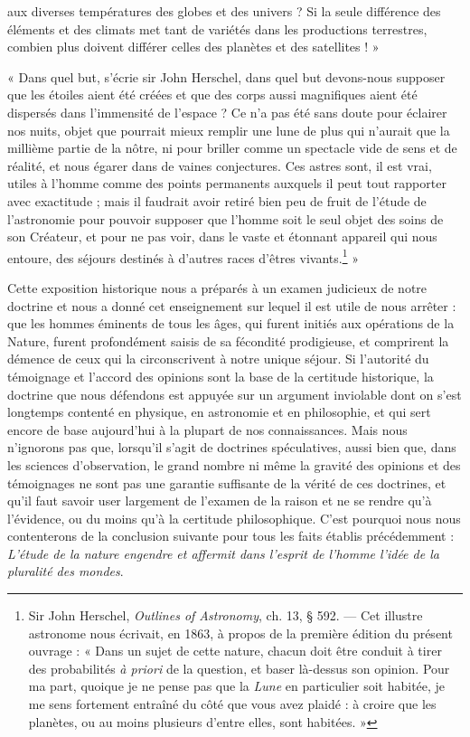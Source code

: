 \documentclass[a4paper, 11pt, oneside]{article}
\begin{document}
aux diverses températures des globes et des univers ? Si la seule différence des éléments et des climats met tant de variétés dans les productions terrestres, combien plus doivent différer celles des planètes et des satellites ! »

« Dans quel but, s'écrie sir John Herschel, dans quel but devons-nous supposer que les étoiles aient été créées et que des corps aussi magnifiques aient été dispersés dans l'immensité de l'espace ? Ce n'a pas été sans doute pour éclairer nos nuits, objet que pourrait mieux remplir une lune de plus qui n'aurait que la millième partie de la nôtre, ni pour briller comme un spectacle vide de sens et de réalité, et nous égarer dans de vaines conjectures. Ces astres sont, il est vrai, utiles à l'homme comme des points permanents auxquels il peut tout rapporter avec exactitude ; mais il faudrait avoir retiré bien peu de fruit de l'étude de l'astronomie pour pouvoir supposer que l'homme soit le seul objet des soins de son Créateur, et pour ne pas voir, dans le vaste et étonnant appareil qui nous entoure, des séjours destinés à d'autres races d'êtres vivants.\footnote{Sir John Herschel, \emph{Outlines of Astronomy}, ch. 13, § 592. --- Cet illustre astronome nous écrivait, en 1863, à propos de la première édition du présent ouvrage : « Dans un sujet de cette nature, chacun doit être conduit à tirer des probabilités \emph{à priori} de la question, et baser là-dessus son opinion. Pour ma part, quoique je ne pense pas que la \emph{Lune} en particulier soit habitée, je me sens fortement entraîné du côté que vous avez plaidé : à croire que les planètes, ou au moins plusieurs d'entre elles, sont habitées. »} »

Cette exposition historique nous a préparés à un examen judicieux de notre doctrine et nous a donné cet enseignement sur lequel il est utile de nous arrêter : que les hommes éminents de tous les âges, qui furent initiés aux opérations de la Nature, furent profondément saisis de sa fécondité prodigieuse, et comprirent la démence de ceux qui la circonscrivent à notre unique séjour. Si l'autorité du témoignage et l'accord des opinions sont la base de la certitude historique, la doctrine que nous défendons est appuyée sur un argument inviolable dont on s'est longtemps contenté en physique, en astronomie et en philosophie, et qui sert encore de base aujourd'hui à la plupart de nos connaissances. Mais nous n'ignorons pas que, lorsqu'il s'agit de doctrines spéculatives, aussi bien que, dans les sciences d'observation, le grand nombre ni même la gravité des opinions et des témoignages ne sont pas une garantie suffisante de la vérité de ces doctrines, et qu'il faut savoir user largement de l'examen de la raison et ne se rendre qu'à l'évidence, ou du moins qu'à la certitude philosophique. C'est pourquoi nous nous contenterons de la conclusion suivante pour tous les faits établis précédemment : \emph{L'étude de la nature engendre et affermit dans l'esprit de l'homme l'idée de la pluralité des mondes}.
\end{document}
